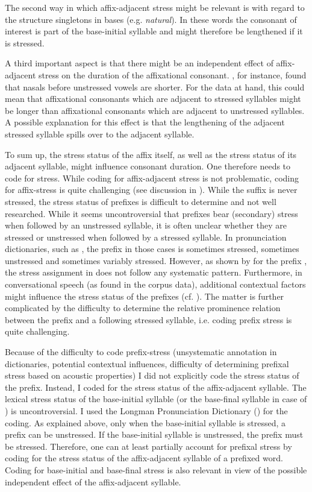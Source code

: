 The second way in which affix-adjacent stress might be relevant is with regard to the structure singletons in bases (e.g. \textit{natural}). In these words the consonant of interest is part of the base-initial syllable and might therefore be lengthened if it is stressed. 

A third important aspect is that there might be an independent effect of affix-adjacent stress on the duration of the affixational consonant. \cite{Umeda.1977}, for instance, found that nasals before unstressed vowels are shorter. For the data at hand, this could mean that affixational consonants which are adjacent to stressed syllables might be longer than affixational consonants which are adjacent to unstressed syllables. A possible explanation for this effect is that the lengthening of the adjacent stressed syllable spills over to the adjacent syllable. 

To sum up, the stress status of the affix itself, as well as the stress status of its adjacent syllable, might influence consonant duration. One therefore needs to code for stress.
While coding for affix-adjacent stress is not problematic, coding for affix-stress is quite challenging (see discussion in ). 
While the suffix  is never stressed, the stress status of prefixes is difficult to determine and not well researched. While it seems uncontroversial that prefixes bear (secondary) stress when followed by an unstressed syllable, it is often unclear whether they are stressed or unstressed when followed by a stressed syllable. In pronunciation dictionaries, such as \cite{Wells.2008}, the prefix in those cases is sometimes stressed, sometimes unstressed and sometimes variably stressed. However, as shown by \cite{Hanote.2010} for the prefix , the stress assignment in \cite{Wells.2008} does not follow any systematic pattern. Furthermore, in conversational speech (as found in the corpus data), additional contextual factors might influence the stress status of the prefixes (cf. \citealt{Videau.2015}). The matter is further complicated by the difficulty to determine the relative prominence relation between the prefix and a following stressed syllable, i.e. coding prefix stress is quite challenging. 

Because of the difficulty to code prefix-stress (unsystematic annotation in dictionaries, potential contextual influences, difficulty of determining prefixal stress based on acoustic properties) I did not explicitly code the stress status of the prefix.
 Instead, I coded for the stress status of the affix-adjacent syllable. The lexical stress status of the base-initial syllable (or the base-final syllable in case of ) is uncontroversial. I used the Longman Pronunciation Dictionary (\citealt{Wells.2008}) for the coding.
 As explained above, only when the base-initial syllable is stressed, a prefix can be unstressed. If the base-initial syllable is unstressed, the prefix must be stressed. Therefore, one can at least partially account for prefixal stress by coding for the stress status of the affix-adjacent syllable of a prefixed word. 
 Coding for base-initial and base-final stress is also relevant in view of the possible independent effect of the affix-adjacent syllable. 
 
